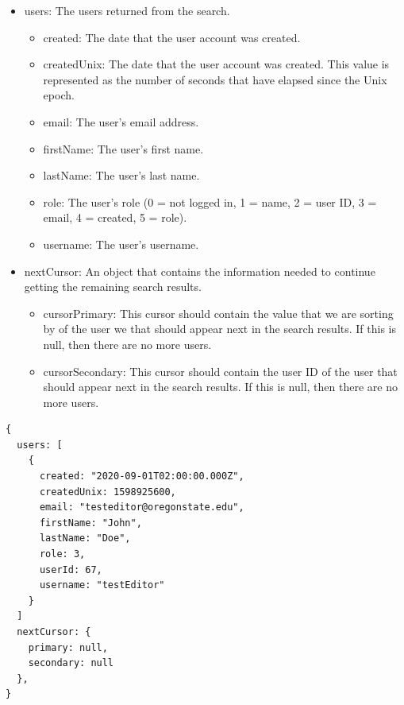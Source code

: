 \documentclass[onecolumn, draftclsnofoot,10pt, compsoc, usenames, dvipsnames]{IEEEtran}
\begin{document}
\begin{itemize}
    \item users: The users returned from the search.
    \begin{itemize}
        \item created: The date that the user account was created.
        \item createdUnix: The date that the user account was created. This value is represented as the number of seconds that have elapsed since the Unix epoch.
        \item email: The user's email address.
        \item firstName: The user's first name.
        \item lastName: The user's last name.
        \item role: The user's role (0 = not logged in, 1 = name, 2 = user ID, 3 = email, 4 = created, 5 = role).
        \item username: The user's username.
    \end{itemize}
    \item nextCursor: An object that contains the information needed to continue getting the remaining search results.
    \begin{itemize}
        \item cursorPrimary: This cursor should contain the value that we are sorting by of the user we that should appear next in the search results. If this is null, then there are no more users.
        \item cursorSecondary: This cursor should contain the user ID of the user that should appear next in the search results. If this is null, then there are no more users.
    \end{itemize}
\end{itemize}
\begin{lstlisting}[caption=Example Response]
{
  users: [
    {
      created: "2020-09-01T02:00:00.000Z",
      createdUnix: 1598925600,
      email: "testeditor@oregonstate.edu",
      firstName: "John",
      lastName: "Doe",
      role: 3,
      userId: 67,
      username: "testEditor"
    }
  ]
  nextCursor: {
    primary: null,
    secondary: null
  },
}
\end{lstlisting}
\\~\\
\end{document}
